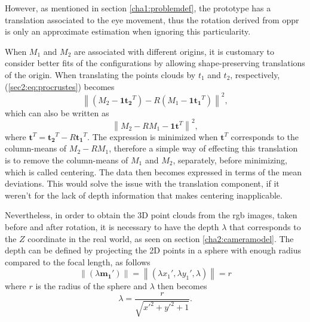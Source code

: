 However, as mentioned in section \ref{cha1:problemdef}, the prototype has a translation associated to the eye movement, thus the rotation derived from \acrshort{oppr} is only an approximate estimation when ignoring this particularity.

When $M_1$ and $M_2$ are associated with different origins, it is customary to consider  better fits of the configurations by allowing shape-preserving translations of the origin.
When translating the points clouds by $t_1$ and $t_2$, respectively, (\ref{sec2:eq:procrustes}) becomes
\begin{equation}
\label{sec2:eq:strans1}
\left \|(M_2 - \mathbf{1} \mathbf{t_2}^T) - R(M_1 - \mathbf{1} \mathbf{t_1}^T)\right \|^2,
\end{equation}
which can also be written as
\begin{equation}
\label{sec2:eq:strans2}
\left \| M_2  - RM_1 - \mathbf{1} \mathbf{t}^T\right \|^2,
\end{equation}
where $\mathbf{t}^T = \mathbf{t_2}^T - R\mathbf{t_1}^T$. The expression is minimized when $\mathbf{t}^T$ corresponds to the column-means of $M_2 - RM_1$, therefore a simple way of effecting this translation is to remove the column-means of $M_1$ and $M_2$, separately, before minimizing, which is called centering. The data then becomes expressed in terms of the mean deviations. \cite{procrustes} This would solve the issue with the translation component, if it weren't for the lack of depth information that makes centering inapplicable. 

Nevertheless, in order to obtain the 3D point clouds from the \acrshort{rgb} images, taken before and after rotation, it is necessary to have the depth $\lambda$ that corresponds to the $Z$ coordinate in the real world, as seen on section \ref{cha2:cameramodel}. The depth can be defined by projecting the 2D points in a sphere with enough radius compared to the focal length, as follows
\begin{equation}
	\label{cha2:sec3:eq:spherepro}
	\left \| (\lambda \mathbf{m_1'})  \right \| = \left \| (\lambda x_1', \lambda y_1', \lambda)  \right \| = r
\end{equation}
where $r$ is the radius of the sphere and $\lambda$ then becomes
\begin{equation}
	\label{cha2:sec3:eq:lamdba}
	\lambda = \frac{r}{\sqrt{x'^2 + y'^2 + 1}}.
\end{equation}


